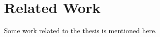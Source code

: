 \section{Related Work}
\label{sec:kappa:related}

Some work related to the thesis is mentioned here.